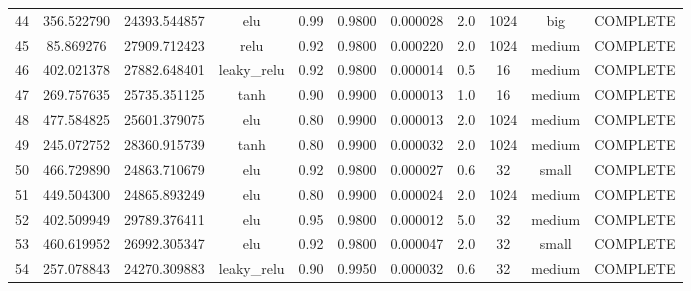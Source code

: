 \begin{longtable}{ccccccccccc}
                       44 &                 356.522790 &                       24393.544857 &             elu &        0.99 & 0.9800 &       0.000028 &             2.0 &     1024 &       big & COMPLETE \\
                       45 &                  85.869276 &                       27909.712423 &            relu &        0.92 & 0.9800 &       0.000220 &             2.0 &     1024 &    medium & COMPLETE \\
                       46 &                 402.021378 &                       27882.648401 &     leaky\_relu &        0.92 & 0.9800 &       0.000014 &             0.5 &       16 &    medium & COMPLETE \\
                       47 &                 269.757635 &                       25735.351125 &            tanh &        0.90 & 0.9900 &       0.000013 &             1.0 &       16 &    medium & COMPLETE \\
                       48 &                 477.584825 &                       25601.379075 &             elu &        0.80 & 0.9900 &       0.000013 &             2.0 &     1024 &    medium & COMPLETE \\
                       49 &                 245.072752 &                       28360.915739 &            tanh &        0.80 & 0.9900 &       0.000032 &             2.0 &     1024 &    medium & COMPLETE \\
                       50 &                 466.729890 &                       24863.710679 &             elu &        0.92 & 0.9800 &       0.000027 &             0.6 &       32 &     small & COMPLETE \\
                       51 &                 449.504300 &                       24865.893249 &             elu &        0.80 & 0.9900 &       0.000024 &             2.0 &     1024 &    medium & COMPLETE \\
                       52 &                 402.509949 &                       29789.376411 &             elu &        0.95 & 0.9800 &       0.000012 &             5.0 &       32 &    medium & COMPLETE \\
                       53 &                 460.619952 &                       26992.305347 &             elu &        0.92 & 0.9800 &       0.000047 &             2.0 &       32 &     small & COMPLETE \\
                       54 &                 257.078843 &                       24270.309883 &     leaky\_relu &        0.90 & 0.9950 &       0.000032 &             0.6 &       32 &    medium & COMPLETE \\

\end{longtable}
